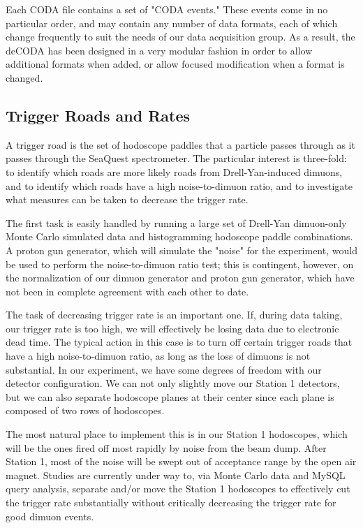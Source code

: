 \documentclass[11pt]{article}
\begin{document}
Each CODA file contains a set of "CODA events."  These events come in no particular order, and may contain any number of data formats, each of which change frequently to suit the needs of our data acquisition group. As a result, the deCODA has been designed in a very modular fashion in order to allow additional formats when added, or allow focused modification when a format is changed.

\subsection{Trigger Roads and Rates}

A trigger road is the set of hodoscope paddles that a particle passes through as it passes through the SeaQuest spectrometer. The particular interest is three-fold: to identify which roads are more likely roads from Drell-Yan-induced dimuons, and to identify which roads have a high noise-to-dimuon ratio, and to investigate what measures can be taken to decrease the trigger rate.

The first task is easily handled by running a large set of Drell-Yan dimuon-only Monte Carlo simulated data and histogramming hodoscope paddle combinations. A proton gun generator, which will simulate the "noise" for the experiment, would be used to perform the noise-to-dimuon ratio test; this is contingent, however, on the normalization of our dimuon generator and proton gun generator, which have not been in complete agreement with each other to date. 

The task of decreasing trigger rate is an important one. If, during data taking, our trigger rate is too high, we will effectively be losing data due to electronic dead time. The typical action in this case is to turn off certain trigger roads that have a high noise-to-dimuon ratio, as long as the loss of dimuons is not substantial. In our experiment, we have some degrees of freedom with our detector configuration. We can not only slightly move our Station 1 detectors, but we can also separate hodoscope planes at their center since each plane is composed of two rows of hodoscopes. 

The most natural place to implement this is in our Station 1 hodoscopes, which will be the ones fired off most rapidly by noise from the beam dump. After Station 1, most of the noise will be swept out of acceptance range by the open air magnet. Studies are currently under way to, via Monte Carlo data and MySQL query analysis, separate and/or move the Station 1 hodoscopes to effectively cut the trigger rate substantially without critically decreasing the trigger rate for good dimuon events.
\end{document}
